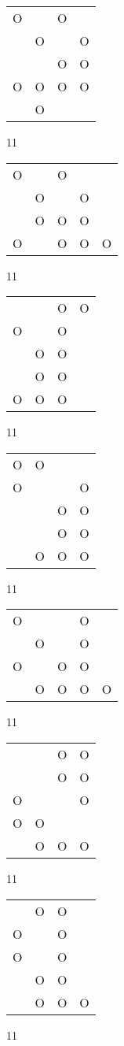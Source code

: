 \begin{tabular}{|m{0.2cm}m{0.2cm}m{0.2cm}m{0.2cm}|}\hline
O& &O& \\
 &O& &O\\
 & &O&O\\
O&O&O&O\\
 &O& & \\
\hline\end{tabular}11
\begin{tabular}{|m{0.2cm}m{0.2cm}m{0.2cm}m{0.2cm}m{0.2cm}|}\hline
O& &O& & \\
 &O& &O& \\
 &O&O&O& \\
O& &O&O&O\\
\hline\end{tabular}11
\begin{tabular}{|m{0.2cm}m{0.2cm}m{0.2cm}m{0.2cm}|}\hline
 & &O&O\\
O& &O& \\
 &O&O& \\
 &O&O& \\
O&O&O& \\
\hline\end{tabular}11
\begin{tabular}{|m{0.2cm}m{0.2cm}m{0.2cm}m{0.2cm}|}\hline
O&O& & \\
O& & &O\\
 & &O&O\\
 & &O&O\\
 &O&O&O\\
\hline\end{tabular}11
\begin{tabular}{|m{0.2cm}m{0.2cm}m{0.2cm}m{0.2cm}m{0.2cm}|}\hline
O& & &O& \\
 &O& &O& \\
O& &O&O& \\
 &O&O&O&O\\
\hline\end{tabular}11
\begin{tabular}{|m{0.2cm}m{0.2cm}m{0.2cm}m{0.2cm}|}\hline
 & &O&O\\
 & &O&O\\
O& & &O\\
O&O& & \\
 &O&O&O\\
\hline\end{tabular}11
\begin{tabular}{|m{0.2cm}m{0.2cm}m{0.2cm}m{0.2cm}|}\hline
 &O&O& \\
O& &O& \\
O& &O& \\
 &O&O& \\
 &O&O&O\\
\hline\end{tabular}11
